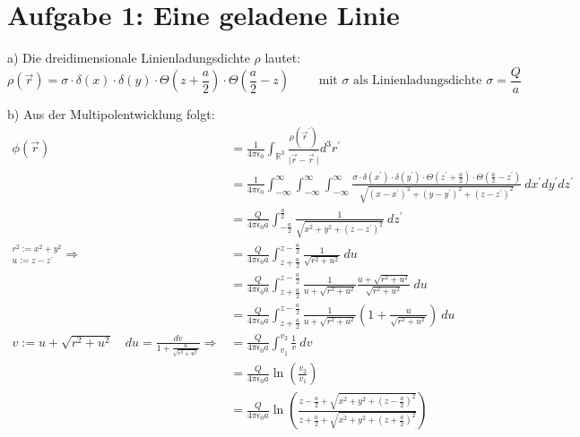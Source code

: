 \documentclass[11pt a4paper]{article}
\newcommand{\epsz}{\epsilon_0}
\newcommand{\kco}{\frac{1}{4\pi\epsilon_0}}
\begin{document}
\thispagestyle{fancy}
\section*{Aufgabe 1: Eine geladene Linie}
\par{a)}
Die dreidimensionale Linienladungsdichte $\rho$ lautet:
\[
	\rho(\vec r) =
	\sigma \cdot \delta(x) \cdot \delta(y) \cdot 
	\Theta\left( z + \frac a 2 \right)
	\cdot \Theta\left(\frac a 2 - z\right)
	\qquad \text{ mit } \sigma \text{ als Linienladungsdichte }
	\sigma = \frac Q a
\]

\par{b)}
Aus der Multipolentwicklung folgt:
\begin{align*}
	\phi (\vec r) 
	&= \kco 
	\int_{\mathbb{R}^3} \frac{\rho(\vec r^\prime)}
	{\vert \vec r - \vec r^\prime \vert} 
	d^3r^\prime \\
	&= \kco
	\int_{-\infty}^\infty
	\int_{-\infty}^\infty
	\int_{-\infty}^\infty
	\frac{
	\sigma \cdot \delta(x^\prime) \cdot \delta(y^\prime) \cdot 
	\Theta\left( z^\prime + \frac a 2 \right)
	\cdot \Theta\left(\frac a 2 - z^\prime \right)}
	{\sqrt{(x-x^\prime)^2 + (y-y^\prime)^2 + (z-z^\prime)^2}} \
	dx^\prime dy^\prime dz^\prime\\
	&= \frac{Q}{4\pi\epsz a} \int_{-\frac a 2}^{\frac a 2}
	\frac1{\sqrt{x^2 + y^2 + (z-z^\prime)^2}} \ dz^\prime \\
	^{r^2 := x^2 + y^2}
	_{u := z - z^\prime}
	\Rightarrow
	&= \frac{Q}{4\pi\epsz a} \int_{z+\frac a 2}^{z-\frac a 2}
	\frac1{\sqrt{r^2 + u^2}} \ du \\
	&= \frac{Q}{4\pi\epsz a} \int_{z+\frac a 2}^{z-\frac a 2}
	\frac{1}{u + \sqrt{r^2 + u^2}}
	\frac{u + \sqrt{r^2 + u^2}}{\sqrt{r^2 + u^2}} 
	\ du \\
	&= \frac{Q}{4\pi\epsz a} \int_{z+\frac a 2}^{z-\frac a 2}
	\frac{1}{u + \sqrt{r^2 + u^2}}
	\left( 1 + \frac{u}{\sqrt{r^2 + u^2}} \right)
	\ du \\
	v:= u+\sqrt{r^2 + u^2} \quad
	du = \frac{dv}{1 + \frac{u}{\sqrt{r^2 + u^2}}}
	\Rightarrow
	&= \frac{Q}{4\pi\epsz a} \int_{v_1}^{v_2}
	\frac{1}{v}
	\ dv \\
	&= \frac{Q}{4\pi\epsz a}
	\ln \left( \frac{v_2}{v_1} \right) \\
	&= \frac{Q}{4\pi\epsz a}
	\ln \left( \frac{
		z-\frac a 2 + \sqrt{x^2 + y^2 + \left(z-\frac a 2\right)^2}}
	{
		z+\frac a 2 + \sqrt{x^2 + y^2 + \left(z+\frac a 2\right)^2}}
	\right)
\end{align*}
\end{document}
